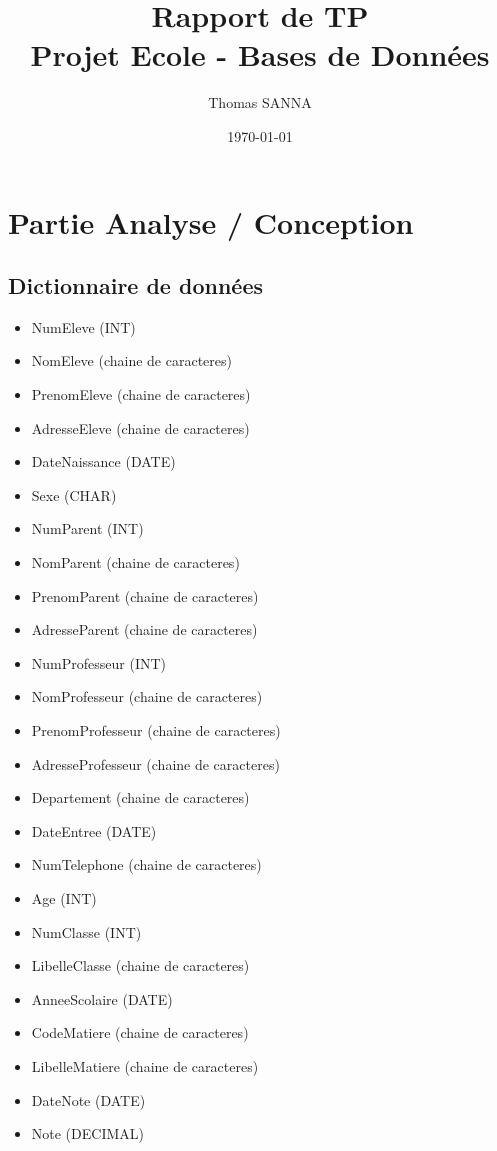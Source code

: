 \documentclass[a4paper,12pt]{article}
\title{Rapport de TP \\ Projet Ecole - Bases de Données}
\author{Thomas SANNA}
\date{\today}
\begin{document}
\maketitle

\tableofcontents

\break
\section{Partie Analyse / Conception}
\subsection{Dictionnaire de données}
\begin{itemize}
  \item NumEleve (INT)
  \item NomEleve (chaine de caracteres)
  \item PrenomEleve (chaine de caracteres)
  \item AdresseEleve (chaine de caracteres)
  \item DateNaissance (DATE)
  \item Sexe (CHAR)
  \item NumParent (INT)
  \item NomParent (chaine de caracteres)
  \item PrenomParent (chaine de caracteres)
  \item AdresseParent (chaine de caracteres)
  \item NumProfesseur (INT)
  \item NomProfesseur (chaine de caracteres)
  \item PrenomProfesseur (chaine de caracteres)
  \item AdresseProfesseur (chaine de caracteres)
  \item Departement (chaine de caracteres)
  \item DateEntree (DATE)
  \item NumTelephone (chaine de caracteres)
  \item Age (INT)
  \item NumClasse (INT)
  \item LibelleClasse (chaine de caracteres)
  \item AnneeScolaire (DATE)
  \item CodeMatiere (chaine de caracteres)
  \item LibelleMatiere (chaine de caracteres)
  \item DateNote (DATE)
  \item Note (DECIMAL)
\end{itemize}
\end{document}
